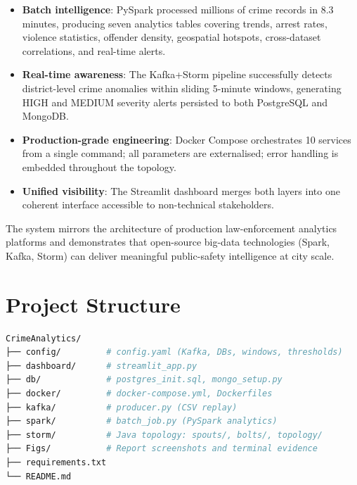 \documentclass[12pt,a4paper]{article}
\begin{document}
\begin{itemize}[leftmargin=1.6em]
  \item \textbf{Batch intelligence}: PySpark processed millions of crime records in 8.3 minutes, producing seven analytics tables covering trends, arrest rates, violence statistics, offender density, geospatial hotspots, cross-dataset correlations, and real-time alerts.
  \item \textbf{Real-time awareness}: The Kafka+Storm pipeline successfully detects district-level crime anomalies within sliding 5-minute windows, generating HIGH and MEDIUM severity alerts persisted to both PostgreSQL and MongoDB.
  \item \textbf{Production-grade engineering}: Docker Compose orchestrates 10 services from a single command; all parameters are externalised; error handling is embedded throughout the topology.
  \item \textbf{Unified visibility}: The Streamlit dashboard merges both layers into one coherent interface accessible to non-technical stakeholders.
\end{itemize}

The system mirrors the architecture of production law-enforcement analytics platforms and demonstrates that open-source big-data technologies (Spark, Kafka, Storm) can deliver meaningful public-safety intelligence at city scale.

\section*{Project Structure}

\begin{lstlisting}[language=bash, caption={Repository Folder Structure}]
CrimeAnalytics/
├── config/         # config.yaml (Kafka, DBs, windows, thresholds)
├── dashboard/      # streamlit_app.py
├── db/             # postgres_init.sql, mongo_setup.py
├── docker/         # docker-compose.yml, Dockerfiles
├── kafka/          # producer.py (CSV replay)
├── spark/          # batch_job.py (PySpark analytics)
├── storm/          # Java topology: spouts/, bolts/, topology/
├── Figs/           # Report screenshots and terminal evidence
├── requirements.txt
└── README.md
\end{lstlisting}
\end{document}
